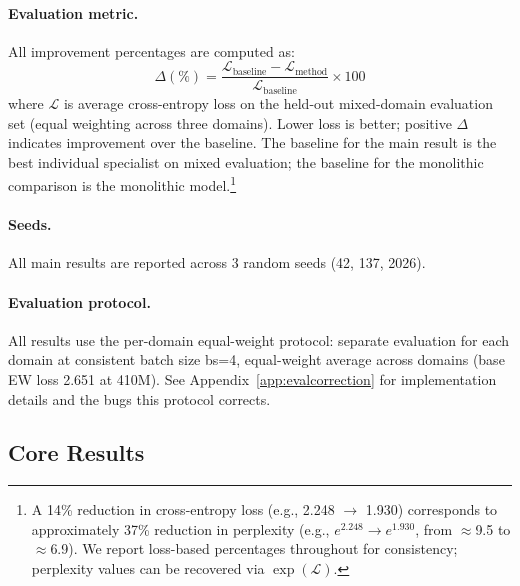 \documentclass{article}
\begin{document}
\paragraph{Evaluation metric.} All improvement percentages are computed as:
\[
\Delta(\%) = \frac{\mathcal{L}_\text{baseline} - \mathcal{L}_\text{method}}{\mathcal{L}_\text{baseline}} \times 100
\]
where $\mathcal{L}$ is average cross-entropy loss on the held-out mixed-domain evaluation set (equal weighting across three domains). Lower loss is better; positive $\Delta$ indicates improvement over the baseline. The baseline for the main result is the best individual specialist on mixed evaluation; the baseline for the monolithic comparison is the monolithic model.\footnote{A 14\% reduction in cross-entropy loss (e.g., 2.248 $\to$ 1.930) corresponds to approximately 37\% reduction in perplexity (e.g., $e^{2.248} \to e^{1.930}$, from $\approx$9.5 to $\approx$6.9). We report loss-based percentages throughout for consistency; perplexity values can be recovered via $\exp(\mathcal{L})$.}

\paragraph{Seeds.} All main results are reported across 3 random seeds (42, 137, 2026).

\paragraph{Evaluation protocol.} All results use the per-domain equal-weight protocol: separate evaluation for each domain at consistent batch size bs=4, equal-weight average across domains (base EW loss 2.651 at 410M). See Appendix~\ref{app:evalcorrection} for implementation details and the bugs this protocol corrects.

\subsection{Core Results}
\label{sec:core}
\end{document}
